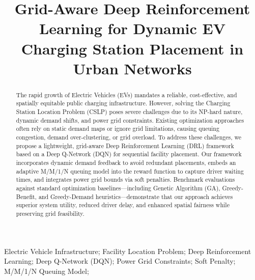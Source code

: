 \documentclass[10pt, conference, a4paper, compsocconf]{IEEEtran}
\begin{document}
\fontsize{10}{12}
\selectfont


\title{Grid-Aware Deep Reinforcement Learning for Dynamic EV Charging Station Placement in Urban Networks}

\author{
}

\maketitle

\begin{abstract}
The rapid growth of Electric Vehicles (EVs) mandates a reliable, cost-effective, and spatially equitable public charging infrastructure. However, solving the Charging Station Location Problem (CSLP) poses severe challenges due to its NP-hard nature, dynamic demand shifts, and power grid constraints. Existing optimization approaches often rely on static demand maps or ignore grid limitations, causing queuing congestion, demand over-clustering, or grid overload. To address these challenges, we propose a lightweight, grid-aware Deep Reinforcement Learning (DRL) framework based on a Deep Q-Network (DQN) for sequential facility placement. Our framework incorporates dynamic demand feedback to avoid redundant placements, embeds an adaptive M/M/1/N queuing model into the reward function to capture driver waiting times, and integrates power grid bounds via soft penalties. Benchmark evaluations against standard optimization baselines—including Genetic Algorithm (GA), Greedy-Benefit, and Greedy-Demand heuristics—demonstrate that our approach achieves superior system utility, reduced driver delay, and enhanced spatial fairness while preserving grid feasibility.
\end{abstract}

\begin{IEEEkeywords}
Electric Vehicle Infrastructure; Facility Location Problem; Deep Reinforcement Learning; Deep Q-Network (DQN); Power Grid Constraints; Soft Penalty; M/M/1/N Queuing Model;
\end{IEEEkeywords}
\end{document}
